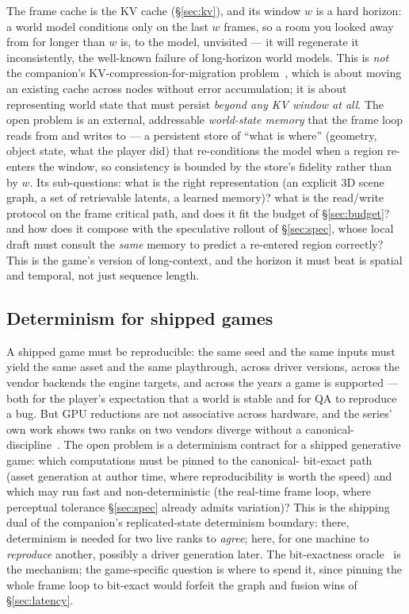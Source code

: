 \documentclass[11pt]{article}
\begin{document}
The frame cache is the KV cache (\S\ref{sec:kv}), and its window $w$ is a hard horizon: a world model conditions
only on the last $w$ frames, so a room you looked away from for longer than $w$ is, to the model, unvisited ---
it will regenerate it inconsistently, the well-known failure of long-horizon world models. This is \emph{not}
the companion's KV-compression-for-migration problem~\cite{openproblems}, which is about moving an existing
cache across nodes without error accumulation; it is about representing world state that must persist
\emph{beyond any KV window at all}. The open problem is an external, addressable \emph{world-state memory} that
the frame loop reads from and writes to --- a persistent store of ``what is where'' (geometry, object state,
what the player did) that re-conditions the model when a region re-enters the window, so consistency is bounded
by the store's fidelity rather than by $w$. Its sub-questions: what is the right representation (an explicit 3D
scene graph, a set of retrievable latents, a learned memory)? what is the read/write protocol on the frame
critical path, and does it fit the budget of \S\ref{sec:budget}? and how does it compose with the speculative
rollout of \S\ref{sec:spec}, whose local draft must consult the \emph{same} memory to predict a re-entered
region correctly? This is the game's version of long-context, and the horizon it must beat is spatial and
temporal, not just sequence length.

\subsection{Determinism for shipped games}
\label{sec:determinism}

A shipped game must be reproducible: the same seed and the same inputs must yield the same asset and the same
playthrough, across driver versions, across the vendor backends the engine targets, and across the years a
game is supported --- both for the player's expectation that a world is stable and for QA to reproduce a bug.
But GPU reductions are not associative across hardware, and the series' own work shows two ranks on two vendors
diverge without a canonical- discipline~\cite{het,oracle}. The open problem is a determinism contract
for a shipped generative game: which computations must be pinned to the canonical- bit-exact
path~\cite{oracle} (asset generation at author time, where reproducibility is worth the speed) and which may
run fast and non-deterministic (the real-time frame loop, where perceptual tolerance \S\ref{sec:spec} already
admits variation)? This is the shipping dual of the companion's replicated-state determinism boundary: there,
determinism is needed for two live ranks to \emph{agree}; here, for one machine to \emph{reproduce} another,
possibly a driver generation later. The bit-exactness oracle~\cite{oracle} is the mechanism; the game-specific
question is where to spend it, since pinning the whole frame loop to bit-exact would forfeit the graph and
fusion wins of \S\ref{sec:latency}.
\end{document}
